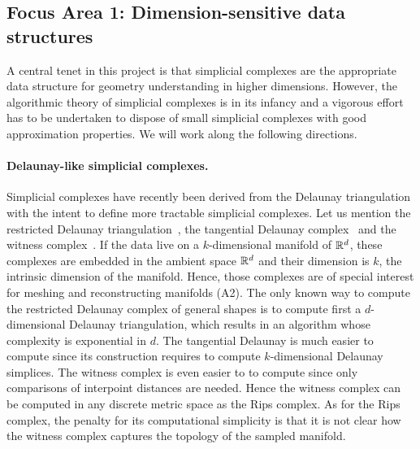 \subsection*{Focus Area 1:  Dimension-sensitive data structures} 

A central tenet in this project is that simplicial complexes are the appropriate data structure for geometry understanding in higher dimensions. However,
the algorithmic theory of simplicial complexes is in its infancy and a vigorous effort has to be undertaken to dispose of small simplicial complexes with good approximation properties.
We will work along the following directions.



\paragraph{Delaunay-like  simplicial complexes.} 
Simplicial complexes have recently been derived from the Delaunay triangulation with the intent to
define more tractable simplicial complexes. Let us mention the restricted Delaunay triangulation~\cite{he-gtmg-2001}, the tangential Delaunay complex~\cite{geometrica-7142i} and the witness complex~\cite{cds-tewc-2004}. %
If the data live on a $k$-dimensional manifold of $\mathbb R ^d$, these complexes are embedded in the ambient space $\mathbb R^d$ and their dimension is $k$, the intrinsic dimension of the manifold.  Hence, those complexes are of special interest for meshing and reconstructing manifolds (A2).  The only known way to compute the restricted Delaunay complex of general shapes is to compute first a $d$-dimensional Delaunay triangulation, which results in an algorithm whose complexity is exponential in $d$. The tangential Delaunay is much easier to compute 
since its construction requires to compute $k$-dimensional Delaunay simplices.
The witness complex is even easier to to compute since only comparisons of interpoint distances are needed. Hence the witness complex can be computed in any discrete metric space as the Rips complex. 
As for the Rips complex, the penalty for its computational simplicity is that it is not clear how the witness complex captures the topology of the sampled manifold. 

